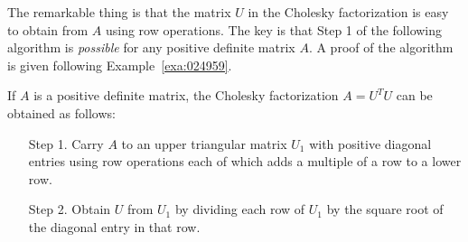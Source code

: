 \documentclass{ximera}
\begin{document}
The remarkable thing is that the matrix $U$ in the Cholesky factorization is easy to obtain from $A$ using row operations. The key is that Step 1 of the following algorithm is \textit{possible} for any positive definite matrix $A$. A proof of the algorithm is given following Example~\ref{exa:024959}.


\begin{theorem}\label{thm:024947}
If $A$ is a positive definite matrix, the Cholesky factorization $A = U^{T}U$ can be obtained as follows:


\begin{itemize}
\item[Step 1.] Carry $A$ to an upper triangular matrix $U_{1}$ with positive diagonal entries using row operations each of which adds a multiple of a row to a lower row.

\item[Step 2.] Obtain $U$ from $U_{1}$ by dividing each row of $U_{1}$ by the square root of the diagonal entry in that row.

\end{itemize}
\end{theorem}
\end{document}
